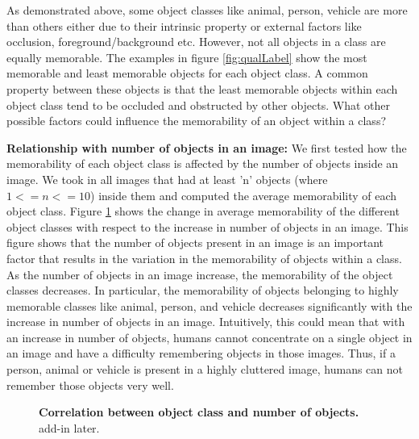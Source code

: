 As demonstrated above, some object classes like animal, person, vehicle are more than others either due to their intrinsic property or external factors like occlusion, foreground/background etc. However, not all objects in a class are equally memorable. The examples in figure \ref{fig:qualLabel} show the most memorable and least memorable objects for each object class. A common property between these objects is that the least memorable objects within each object class tend to be occluded and obstructed by other objects. What other possible factors could influence the memorability of an object within a class?



\textbf{Relationship with number of objects in an image:} We first tested how the memorability of each object class is affected by the number of objects inside an image. We took in all images that had at least 'n' objects (where $1 <= n <= 10$) inside them and computed the average memorability of each object class. Figure \ref{fig:obLabelChange} shows the change in average memorability of the different object classes with respect to the increase in number of objects in an image. This figure shows that the number of objects present in an image is an important factor that results in the variation in the memorability of objects within a class. As the number of objects in an image increase, the memorability of the object classes decreases. In particular, the memorability of objects belonging to highly memorable classes like animal, person, and vehicle decreases significantly with the increase in number of objects in an image. Intuitively, this could mean that with an increase in number of objects, humans cannot concentrate on a single object in an image and have a difficulty remembering objects in those images. Thus, if a person, animal or vehicle is present in a highly cluttered image, humans can not remember those objects very well.

\begin{figure}[t]
\centering
{}
\vspace{-5mm}\caption{\footnotesize\textbf{Correlation between object class and number of objects.} add-in later. }\label{fig:obLabelChange}
\end{figure}

